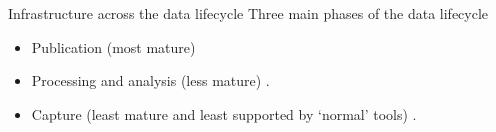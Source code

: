 

\begin{frame}{Infrastructure across the data lifecycle}
    Three main phases of the data lifecycle
    \begin{itemize}
        \item Publication (most mature)
        \item Processing and analysis (less mature) \parencite{Stewart_Lowndes2017-lj, Alveo2019-tk} .
        \item Capture (least mature and least supported by `normal' tools) \parencite{Bureau_of_Reclamation2017-xl}.
    \end{itemize}
\end{frame}
\textbf{}